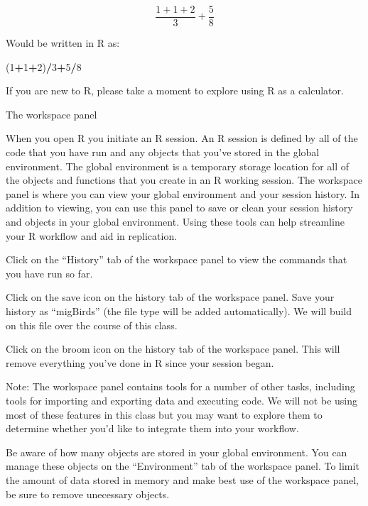 \documentclass[]{article}
\newenvironment{Shaded}{\begin{snugshade}}{\end{snugshade}}
\newcommand{\DecValTok}[1]{\textcolor[rgb]{0.00,0.00,0.81}{#1}}
\newcommand{\OperatorTok}[1]{\textcolor[rgb]{0.81,0.36,0.00}{\textbf{#1}}}
\newcommand{\NormalTok}[1]{#1}
\begin{document}
\[\frac{1+1+2}{3} + \frac{5}{8}\]

Would be written in R as:

\begin{Shaded}
\begin{Highlighting}[]
\NormalTok{(}\DecValTok{1}\OperatorTok{+}\DecValTok{1}\OperatorTok{+}\DecValTok{2}\NormalTok{)}\OperatorTok{/}\DecValTok{3}\OperatorTok{+}\DecValTok{5}\OperatorTok{/}\DecValTok{8} 
\end{Highlighting}
\end{Shaded}

 If you are new to R, please take a moment to explore using R as a
calculator.

The workspace panel

When you open R you initiate an R session. An R session is defined by
all of the code that you have run and any objects that you've stored in
the global environment. The global environment is a temporary storage
location for all of the objects and functions that you create in an R
working session. The workspace panel is where you can view your global
environment and your session history. In addition to viewing, you can
use this panel to save or clean your session history and objects in your
global environment. Using these tools can help streamline your R
workflow and aid in replication.

 Click on the ``History'' tab of the workspace panel to view the
commands that you have run so far.

 Click on the save icon on the history tab of the workspace panel. Save
your history as ``migBirds'' (the file type will be added
automatically). We will build on this file over the course of this
class.

 Click on the broom icon on the history tab of the workspace panel. This
will remove everything you've done in R since your session began.

Note: The workspace panel contains tools for a number of other tasks,
including tools for importing and exporting data and executing code. We
will not be using most of these features in this class but you may want
to explore them to determine whether you'd like to integrate them into
your workflow.

 Be aware of how many objects are stored in your global environment. You
can manage these objects on the ``Environment'' tab of the workspace
panel. To limit the amount of data stored in memory and make best use of
the workspace panel, be sure to remove unecessary objects.
\end{document}
